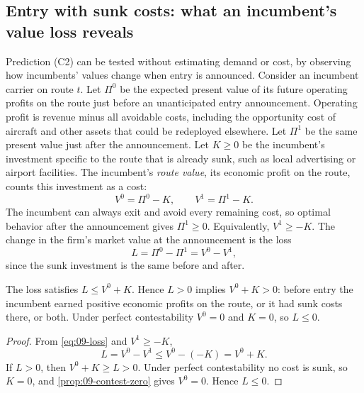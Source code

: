 \subsection{Entry with sunk costs: what an incumbent's value loss reveals}\label{sec:09-entry-sunk}

Prediction (C2) can be tested without estimating demand or cost, by observing how incumbents' values change
when entry is announced. Consider an incumbent carrier on route $t$. Let $\Pi^0$ be the expected present value
of its future operating profits on the route just before an unanticipated entry announcement. Operating profit
is revenue minus all avoidable costs, including the opportunity cost of aircraft and other assets that could be
redeployed elsewhere. Let $\Pi^1$ be the same present value just after the announcement. Let $K \ge 0$ be the
incumbent's investment specific to the route that is already sunk, such as local advertising or airport
facilities. The incumbent's \emph{route value}, its economic profit on the route, counts this investment as a
cost:
\begin{equation}\label{eq:09-routevalue}
  V^0 = \Pi^0 - K, \qquad V^1 = \Pi^1 - K.
\end{equation}
The incumbent can always exit and avoid every remaining cost, so optimal behavior after the announcement gives
$\Pi^1 \ge 0$. Equivalently, $V^1 \ge -K$. The change in the firm's market value at the announcement is the
loss
\begin{equation}\label{eq:09-loss}
  L = \Pi^0 - \Pi^1 = V^0 - V^1,
\end{equation}
since the sunk investment is the same before and after.

\begin{proposition}\label{prop:09-valueloss}
The loss satisfies $L \le V^0 + K$. Hence $L > 0$ implies $V^0 + K > 0$: before entry the incumbent earned
positive economic profits on the route, or it had sunk costs there, or both. Under perfect contestability
$V^0 = 0$ and $K = 0$, so $L \le 0$.
\end{proposition}

\begin{proof}
From \eqref{eq:09-loss} and $V^1 \ge -K$,
\begin{equation*}
  L = V^0 - V^1 \le V^0 - (-K) = V^0 + K.
\end{equation*}
If $L > 0$, then $V^0 + K \ge L > 0$. Under perfect contestability no cost is sunk, so $K = 0$, and
\cref{prop:09-contest-zero} gives $V^0 = 0$. Hence $L \le 0$.
\end{proof}

